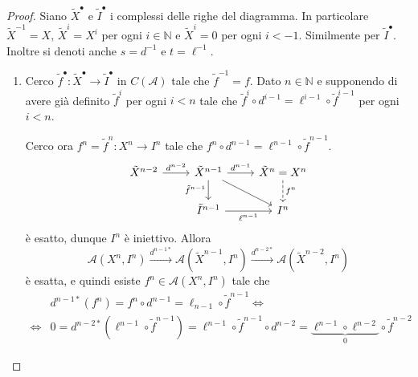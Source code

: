 \begin{proof}{}
    Siano \(\tilde{X}^\bullet\) e \(\tilde{I}^\bullet\) i complessi delle righe
    del diagramma. In particolare \(\tilde{X}^{-1} = X\), \(\tilde{X}^{i} =
    X^{i}\) per ogni \(i \in \mathbb{N}\) e \(\tilde{X}^{i} = 0\) per ogni \(i <
    -1\). Similmente per \(\tilde{I}^{\bullet}\). Inoltre si denoti anche \(s =
    d^{-1}\) e \(t = \ell^{-1}\).

\begin{enumerate}[label = \arabic*)]
    \item Cerco \(\tilde{f}^\bullet : \tilde{X}^\bullet \to \tilde{I}^\bullet\)
        in \(C{(\mathcal{A})}\) tale che \(\tilde{f}^{-1} = f\). Dato \(n \in
        \mathbb{N}\) e supponendo di avere già definito \(\tilde{f}^{i} \) per
    ogni \(i < n\) tale che \(\tilde{f}^{i} \circ d^{i-1} = \ell^{i-1} \circ
    \tilde{f}^{i-1}\) per ogni \(i < n\).

    Cerco ora \(f^{n} = \tilde{f}^{n} : X^{n} \to I^{n}\) tale che \(f^{n} \circ
    d^{n-1} = \ell^{n-1} \circ \tilde{f}^{n-1}\).
    \[ \begin{tikzcd}
	\tilde{X}^{n-2} & \tilde{X}^{n-1} & \tilde{X}^{n} = X^{n} \\
	& \tilde{I}^{n-1} & I^{n}
	\arrow["{d^{n-2}}", from=1-1, to=1-2]
	\arrow["{d^{n-1}}", from=1-2, to=1-3]
	\arrow["{\tilde{f}^{n-1}}"', from=1-2, to=2-2]
	\arrow[from=1-2, to=2-3]
	\arrow["{f^n}", dashed, from=1-3, to=2-3]
	\arrow["{\ell^{n-1}}"', from=2-2, to=2-3]
\end{tikzcd} \]
    è esatto, dunque \(I^{n}\) è iniettivo. Allora
    \[
      \mathcal{A}{(X^{n}, I^{n})} \overset{d^{n-1 *}}{\to}
      \mathcal{A}{(\tilde{X}^{n-1}, I^{n})} \overset{d^{n-2*}}{\to}
      \mathcal{A}{(\tilde{X}^{n-2}, I^{n})}
    \] è esatta, e quindi esiste \(f^{n} \in \mathcal{A}{(X^{n}, I^{n})}\) tale
    che 
    \begin{align*}
      &d^{n-1*}{(f^{n})} = f^{n} \circ d^{n-1} = \ell_{n-1}  \circ
      \tilde{f}^{n-1} \iff \\ \iff &0 = d^{n-2*}{\left( \ell^{n-1} \circ \tilde{f}^{n-1}
      \right)} = \ell^{n-1} \circ \tilde{f}^{n-1} \circ d^{n-2} =
      \underbrace{\ell^{n-1} \circ \ell^{n-2}}_{0} \circ \tilde{f}^{n-2}
    \end{align*}


\end{enumerate}
\end{proof}
